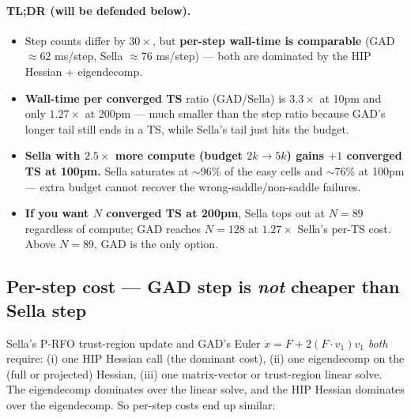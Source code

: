 \documentclass[11pt]{article}
\begin{document}
\paragraph{TL;DR (will be defended below).}
\begin{itemize}[leftmargin=1.5em]
\item Step counts differ by $30\!\times$, but \textbf{per-step wall-time is
  comparable} (GAD $\approx 62$ ms/step, Sella $\approx 76$ ms/step) — both
  are dominated by the HIP Hessian + eigendecomp.
\item \textbf{Wall-time per converged TS} ratio (GAD/Sella) is
  $3.3\!\times$ at 10pm and only $\mathbf{1.27\!\times}$ at 200pm — much
  smaller than the step ratio because GAD's longer tail still ends in a
  TS, while Sella's tail just hits the budget.
\item \textbf{Sella with $2.5\!\times$ more compute (budget $2k\!\to\!5k$)
  gains $+1$ converged TS at 100pm.} Sella saturates at $\sim$96\% of
  the easy cells and $\sim$76\% at 100pm — extra budget cannot recover
  the wrong-saddle/non-saddle failures.
\item \textbf{If you want $N$ converged TS at 200pm}, Sella tops out at
  $N{=}89$ regardless of compute; GAD reaches $N{=}128$ at $1.27\times$
  Sella's per-TS cost. Above $N{=}89$, GAD is the only option.
\end{itemize}

\subsection{Per-step cost — GAD step is \emph{not} cheaper than Sella step}

Sella's P-RFO trust-region update and GAD's Euler $\dot x = F + 2(F\!\cdot\!v_1)v_1$
\emph{both} require: (i) one HIP Hessian call (the dominant cost), (ii)
one eigendecomp on the (full or projected) Hessian, (iii) one matrix-vector
or trust-region linear solve. The eigendecomp dominates over the linear
solve, and the HIP Hessian dominates over the eigendecomp. So per-step
costs end up similar:
\end{document}
